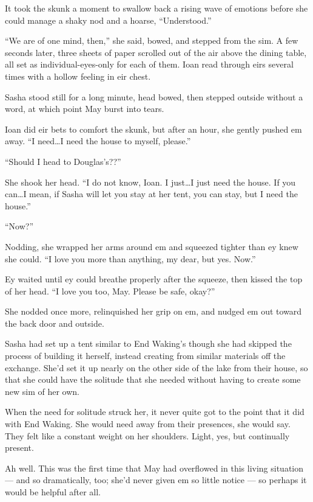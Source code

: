 It took the skunk a moment to swallow back a rising wave of emotions before she could manage a shaky nod and a hoarse, ``Understood.''

``We are of one mind, then,'' she said, bowed, and stepped from the sim. A few seconds later, three sheets of paper scrolled out of the air above the dining table, all set as individual-eyes-only for each of them. Ioan read through eirs several times with a hollow feeling in eir chest.

Sasha stood still for a long minute, head bowed, then stepped outside without a word, at which point May burst into tears.

Ioan did eir bets to comfort the skunk, but after an hour, she gently pushed em away. ``I need\ldots I need the house to myself, please.''

``Should I head to Douglas's??''

She shook her head. ``I do not know, Ioan. I just\ldots I just need the house. If you can\ldots I mean, if Sasha will let you stay at her tent, you can stay, but I need the house.''

``Now?''

Nodding, she wrapped her arms around em and squeezed tighter than ey knew she could. ``I love you more than anything, my dear, but yes. Now.''

Ey waited until ey could breathe properly after the squeeze, then kissed the top of her head. ``I love you too, May. Please be safe, okay?''

She nodded once more, relinquished her grip on em, and nudged em out toward the back door and outside.

Sasha had set up a tent similar to End Waking's though she had skipped the process of building it herself, instead creating from similar materials off the exchange. She'd set it up nearly on the other side of the lake from their house, so that she could have the solitude that she needed without having to create some new sim of her own.

When the need for solitude struck her, it never quite got to the point that it did with End Waking. She would need away from their presences, she would say. They felt like a constant weight on her shoulders. Light, yes, but continually present.

Ah well. This was the first time that May had overflowed in this living situation — and so dramatically, too; she'd never given em so little notice — so perhaps it would be helpful after all.

